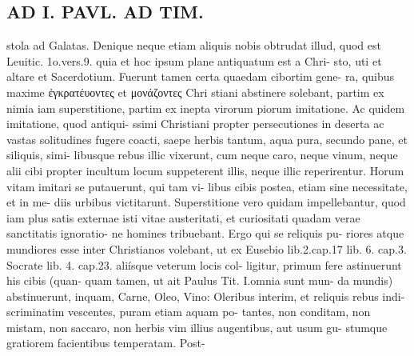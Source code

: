 \documentclass{article}
\begin{document}
\begin{pages}
\section*{AD I. PAVL. AD TIM. }
\marginpar{[ p.378 ]}stola ad Galatas. Denique neque etiam aliquis nobis obtrudat illud, quod est Leuitic. 1o.vers.9. quia et hoc ipsum plane antiquatum est a Chri- sto, uti et altare et Sacerdotium. Fuerunt tamen certa quaedam cibortim gene- ra, quibus maxime ἐγκρατέυοντες et μονάζοντες Chri stiani abstinere solebant, partim ex nimia iam superstitione, partim ex inepta virorum piorum imitatione. Ac quidem imitatione, quod antiqui- ssimi Christiani propter persecutiones in deserta ac vastas solitudines fugere coacti, saepe herbis tantum, aqua pura, secundo pane, et siliquis, simi- libusque rebus illic vixerunt, cum neque caro, neque vinum, neque alii cibi propter incultum locum suppeterent illis, neque illic reperirentur. Horum vitam imitari se putauerunt, qui tam vi- libus cibis postea, etiam sine necessitate, et in me- diis urbibus victitarunt. Superstitione vero quidam impellebantur, quod iam plus satis externae isti vitae austeritati, et curiositati quadam verae sanctitatis ignoratio- ne homines tribuebant. Ergo qui se reliquis pu- riores atque mundiores esse inter Christianos volebant, ut ex Eusebio lib.2.cap.17 lib. 6. cap.3. Socrate lib. 4. cap.23. aliísque veterum locis col- ligitur, primum fere astinuerunt his cibis (quan- quam tamen, ut ait Paulus Tit. I.omnia sunt mun- da mundis) abstinuerunt, inquam, Carne, Oleo, Vino: Oleribus interim, et reliquis rebus indi- scriminatim vescentes, puram etiam aquam po- tantes, non conditam, non mistam, non saccaro, non herbis vim illius augentibus, aut usum gu- stumque gratiorem facientibus temperatam. Post- 

\end{pages}
\end{document}
